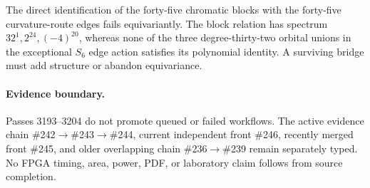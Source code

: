 The direct identification of the forty-five chromatic blocks with the forty-five curvature-route edges fails equivariantly. The block relation has spectrum $32^1,2^{24},(-4)^{20}$, whereas none of the three degree-thirty-two orbital unions in the exceptional $S_6$ edge action satisfies its polynomial identity. A surviving bridge must add structure or abandon equivariance.

\paragraph{Evidence boundary.}
Passes 3193--3204 do not promote queued or failed workflows. The active evidence chain \#242$\to$\#243$\to$\#244, current independent front \#246, recently merged front \#245, and older overlapping chain \#236$\to$\#239 remain separately typed. No FPGA timing, area, power, PDF, or laboratory claim follows from source completion.
